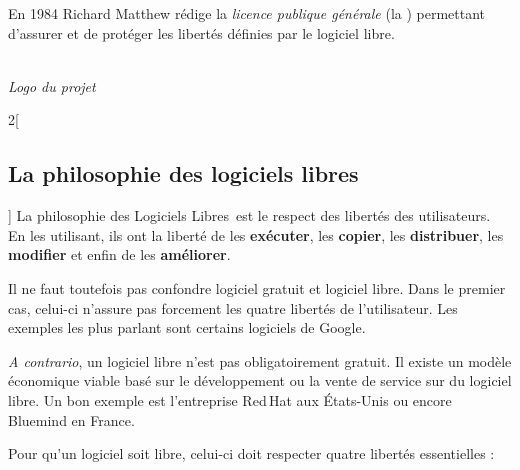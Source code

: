\newcommand{\lls}{Logiciels Libres~}


\begin{minipage}{0.7\textwidth}
En 1984 \textcolor{Cdl}{Richard Matthew } rédige la \textcolor{Cdl}{\textit{licence publique générale }} (la ) permettant d’assurer et de protéger les libertés définies par le logiciel libre. 
\end{minipage}
\begin{minipage}{0.3\textwidth}
\begin{center}
\\
\textit{Logo du projet }
\end{center}
\end{minipage}

\begin{multicols}{2}[\subsection{La philosophie des logiciels libres}]
La philosophie des \lls est le respect des libertés des utilisateurs. En les utilisant, ils ont la liberté de les \textbf{exécuter}, les \textbf{copier}, les \textbf{distribuer}, les \textbf{modifier} et enfin de les \textbf{améliorer}.

Il ne faut toutefois pas confondre logiciel gratuit et logiciel libre. Dans le premier cas, celui-ci n’assure pas forcement les quatre libertés de l’utilisateur. Les exemples les plus parlant sont certains logiciels de Google.

\textit{A contrario}, un  logiciel libre n’est pas obligatoirement gratuit. Il existe un modèle économique viable basé sur le développement ou la vente de service sur du logiciel libre. Un bon exemple est l’entreprise Red\,Hat aux États-Unis ou encore Bluemind en France.
\end{multicols}


Pour qu’un logiciel soit libre, celui-ci doit respecter quatre libertés essentielles :

